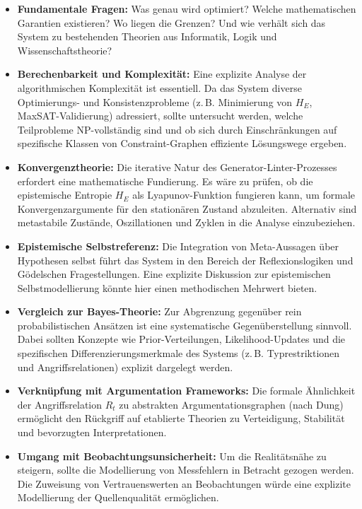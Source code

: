 \documentclass[11pt, a4paper]{article}
\begin{document}
\begin{itemize}
	\item \textbf{Fundamentale Fragen:} Was genau wird optimiert? Welche mathematischen Garantien existieren? Wo liegen die Grenzen? Und wie verhält sich das System zu bestehenden Theorien aus Informatik, Logik und Wissenschaftstheorie?
	\item \textbf{Berechenbarkeit und Komplexität:} Eine explizite Analyse der algorithmischen Komplexität ist essentiell. Da das System diverse Optimierungs- und Konsistenzprobleme (z.\,B. Minimierung von $H_E$, MaxSAT-Validierung) adressiert, sollte untersucht werden, welche Teilprobleme NP-vollständig sind und ob sich durch Einschränkungen auf spezifische Klassen von Constraint-Graphen effiziente Lösungswege ergeben.
	
	\item \textbf{Konvergenztheorie:} Die iterative Natur des Generator-Linter-Prozesses erfordert eine mathematische Fundierung. Es wäre zu prüfen, ob die epistemische Entropie $H_E$ als Lyapunov-Funktion fungieren kann, um formale Konvergenzargumente für den stationären Zustand abzuleiten. Alternativ sind metastabile Zustände, Oszillationen und Zyklen in die Analyse einzubeziehen.
	
	\item \textbf{Epistemische Selbstreferenz:} Die Integration von Meta-Aussagen über Hypothesen selbst führt das System in den Bereich der Reflexionslogiken und Gödelschen Fragestellungen. Eine explizite Diskussion zur epistemischen Selbstmodellierung könnte hier einen methodischen Mehrwert bieten.
	
	\item \textbf{Vergleich zur Bayes-Theorie:} Zur Abgrenzung gegenüber rein probabilistischen Ansätzen ist eine systematische Gegenüberstellung sinnvoll. Dabei sollten Konzepte wie Prior-Verteilungen, Likelihood-Updates und die spezifischen Differenzierungsmerkmale des Systems (z.\,B. Typrestriktionen und Angriffsrelationen) explizit dargelegt werden.
	
	\item \textbf{Verknüpfung mit Argumentation Frameworks:} Die formale Ähnlichkeit der Angriffsrelation $R_t$ zu abstrakten Argumentationsgraphen (nach Dung) ermöglicht den Rückgriff auf etablierte Theorien zu Verteidigung, Stabilität und bevorzugten Interpretationen.
	
	\item \textbf{Umgang mit Beobachtungsunsicherheit:} Um die Realitätsnähe zu steigern, sollte die Modellierung von Messfehlern in Betracht gezogen werden. Die Zuweisung von Vertrauenswerten an Beobachtungen würde eine explizite Modellierung der Quellenqualität ermöglichen.
	

\end{itemize}
\end{document}
